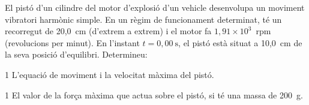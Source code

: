 El pistó d'un cilindre del motor d'explosió d'un vehicle desenvolupa un moviment vibratori harmònic simple. En un règim de funcionament determinat, té un recorregut de 20,0~cm (d'extrem a extrem) i el motor fa $1,91\times 10^{3}$~rpm (revolucions per minut). En l'instant $t = 0,00\ \mathrm{s}$, el pistó està situat a 10,0~cm de la seva posició d'equilibri. Determineu:

\begin{apartat}{1}
L'equació de moviment i la velocitat màxima del pistó.
\end{apartat}

\begin{apartat}{1}
El valor de la força màxima que actua sobre el pistó, si té una massa de 200~g.
\end{apartat}
